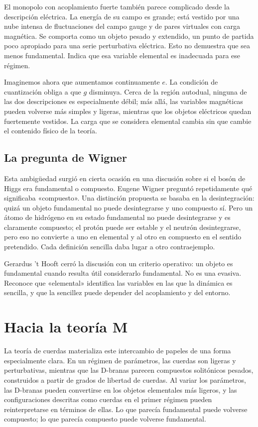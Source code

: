 El monopolo con acoplamiento fuerte también parece complicado desde la descripción eléctrica. La energía de su campo es grande; está vestido por una nube intensa de fluctuaciones del campo gauge y de pares virtuales con carga magnética. Se comporta como un objeto pesado y extendido, un punto de partida poco apropiado para una serie perturbativa eléctrica. Esto no demuestra que sea menos fundamental. Indica que esa variable elemental es inadecuada para ese régimen.

Imaginemos ahora que aumentamos continuamente \(e\). La condición de cuantización obliga a que \(g\) disminuya. Cerca de la región autodual, ninguna de las dos descripciones es especialmente débil; más allá, las variables magnéticas pueden volverse más simples y ligeras, mientras que los objetos eléctricos quedan fuertemente vestidos. La carga que se considera elemental cambia sin que cambie el contenido físico de la teoría.

\subsection{La pregunta de Wigner}

Esta ambigüedad surgió en cierta ocasión en una discusión sobre si el bosón de Higgs era fundamental o compuesto. Eugene Wigner preguntó repetidamente qué significaba «compuesto». Una distinción propuesta se basaba en la desintegración: quizá un objeto fundamental no puede desintegrarse y uno compuesto sí. Pero un átomo de hidrógeno en su estado fundamental no puede desintegrarse y es claramente compuesto; el protón puede ser estable y el neutrón desintegrarse, pero eso no convierte a uno en elemental y al otro en compuesto en el sentido pretendido. Cada definición sencilla daba lugar a otro contraejemplo.

Gerardus 't Hooft cerró la discusión con un criterio operativo: un objeto es fundamental cuando resulta útil considerarlo fundamental. No es una evasiva. Reconoce que «elemental» identifica las variables en las que la dinámica es sencilla, y que la sencillez puede depender del acoplamiento y del entorno.

\section{Hacia la teoría M}

La teoría de cuerdas materializa este intercambio de papeles de una forma especialmente clara. En un régimen de parámetros, las cuerdas son ligeras y perturbativas, mientras que las D-branas parecen compuestos solitónicos pesados, construidos a partir de grados de libertad de cuerdas. Al variar los parámetros, las D-branas pueden convertirse en los objetos elementales más ligeros, y las configuraciones descritas como cuerdas en el primer régimen pueden reinterpretarse en términos de ellas. Lo que parecía fundamental puede volverse compuesto; lo que parecía compuesto puede volverse fundamental.

